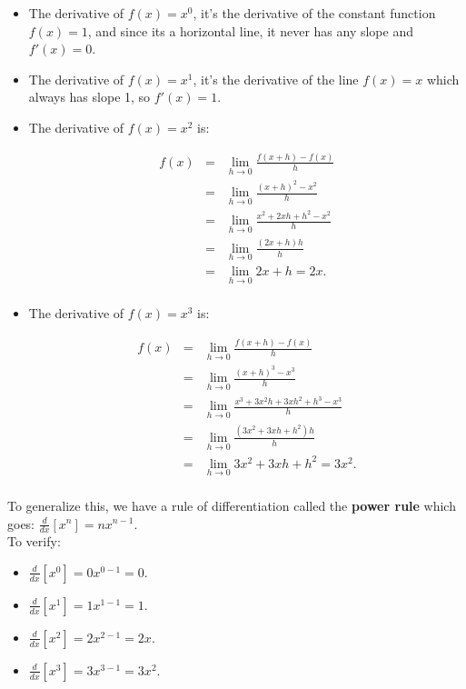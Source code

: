 \documentclass[10pt]{article}
\theoremstyle{definition}
\newcommand{\limit}[2]{\displaystyle{ \lim_{#1 \to #2}}}
\begin{document}
\begin{itemize}
\item The derivative of $f(x)=x^0$, it's the derivative of the  constant function $f(x)=1$, and since its a horizontal line, it never has any slope and $f'(x)=0$.
\item  The derivative of $f(x)=x^1$, it's the derivative of the line $f(x)=x$ which always has slope 1, so $f'(x)=1$.

\item The derivative of $f(x)=x^2$ is:

\begin{eqnarray*}
f(x)&=&\limit{h}{0}\frac{f(x+h)-f(x)}{h}\\
&=&\limit{h}{0} \frac{(x+h)^2-x^2}{h}\\
&=&\limit{h}{0} \frac{x^2+2xh+h^2-x^2}{h}\\
&=&\limit{h}{0} \frac{(2x+h)h}{h}\\
&=&\limit{h}{0} 2x+h=2x.\\
\end{eqnarray*}


\item The derivative of $f(x)=x^3$ is:

\begin{eqnarray*}
f(x)&=&\limit{h}{0}\frac{f(x+h)-f(x)}{h}\\
&=&\limit{h}{0} \frac{(x+h)^3-x^3}{h}\\
&=&\limit{h}{0} \frac{x^3+3x^2h+3xh^2+h^3-x^3}{h}\\
&=&\limit{h}{0} \frac{(3x^2+3xh+h^2)h}{h}\\
&=&\limit{h}{0} 3x^2+3xh+h^2=3x^2.\\
\end{eqnarray*}
 
\end{itemize}

To generalize this, we have a rule of differentiation called the {\bf power rule} which goes: $\frac{d}{dx}[x^n]=nx^{n-1}$. \\ 

To verify:

\begin{itemize}
\item $\frac{d}{dx}[x^0]=0x^{0-1}=0$.
\item $\frac{d}{dx}[x^1]=1x^{1-1}=1$.
\item $\frac{d}{dx}[x^2]=2x^{2-1}=2x$.
\item $\frac{d}{dx}[x^3]=3x^{3-1}=3x^2$.
\end{itemize}
\end{document}
